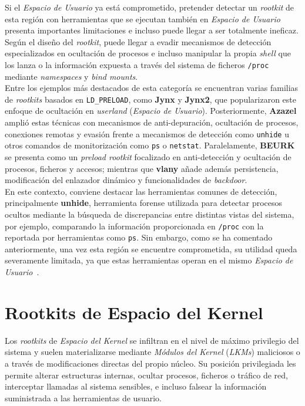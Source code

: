 Si el \textit{Espacio de Usuario} ya está comprometido, pretender detectar un \textit{rootkit} de esta región con herramientas que se ejecutan también en \textit{Espacio de Usuario} presenta importantes limitaciones e incluso puede llegar a ser totalmente ineficaz.
Según el diseño del \textit{rootkit}, puede llegar a evadir mecanismos de detección especializados en ocultación de procesos e incluso manipular la propia \textit{shell} que los lanza o la información expuesta a través del sistema de ficheros \texttt{/proc} mediante \textit{namespaces} y \textit{bind mounts}.\\

Entre los ejemplos más destacados de esta categoría se encuentran varias familias de \textit{rootkits} basados en \texttt{LD\_PRELOAD},
como \textbf{Jynx} y \textbf{Jynx2}, que popularizaron este enfoque de ocultación en \textit{userland} (\textit{Espacio de Usuario}).
Posteriormente, \textbf{Azazel} amplió estas técnicas con mecanismos de anti-depuración, ocultación de procesos, conexiones remotas y evasión frente a mecanismos de detección como \texttt{unhide} u otros comandos de monitorización como \texttt{ps} o \texttt{netstat}.
Paralelamente, \textbf{BEURK} se presenta como un \textit{preload rootkit} focalizado en anti-detección y ocultación de procesos, ficheros y accesos;
mientras que \textbf{vlany} añade además persistencia, modificación del enlazador dinámico y funcionalidades de \textit{backdoor}.\\

En este contexto, conviene destacar las herramientas comunes de detección,
principalmente \textbf{unhide}, herramienta forense utilizada para detectar procesos ocultos mediante la búsqueda de discrepancias entre distintas vistas del sistema,
por ejemplo, comparando la información proporcionada en \texttt{/proc} con la reportada por herramientas como \texttt{ps}.
Sin embargo, como se ha comentado anteriormente, una vez esta región se encuentre comprometida, su utilidad queda severamente limitada, ya que estas herramientas operan en el mismo \textit{Espacio de Usuario}~\cite{unhide_man}.\\

\section{Rootkits de Espacio del Kernel}
\label{sec:kernel_rootkits}

Los \textit{rootkits} de \textit{Espacio del Kernel} se infiltran en el nivel de máximo privilegio del sistema y suelen materializarse mediante \textit{Módulos del Kernel} (\textit{LKMs}) maliciosos o a través de modificaciones directas del propio núcleo.
Su posición privilegiada les permite alterar estructuras internas, ocultar procesos, ficheros o tráfico de red, interceptar llamadas al sistema sensibles, e incluso falsear la información suministrada a las herramientas de usuario.\\

